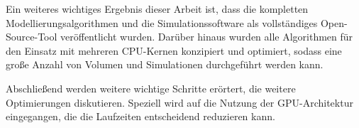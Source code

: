 Ein weiteres wichtiges Ergebnis dieser Arbeit ist, dass die kompletten Modellierungsalgorithmen und die Simulationssoftware als vollständiges Open-Source-Tool veröffentlicht wurden.
Darüber hinaus wurden alle Algorithmen für den Einsatz mit mehreren CPU-Kernen konzipiert und optimiert, sodass eine große Anzahl von Volumen und Simulationen durchgeführt werden kann.

Abschließend werden weitere wichtige Schritte erörtert, die weitere Optimierungen diskutieren.
Speziell wird auf die Nutzung der GPU-Architektur eingegangen, die die Laufzeiten entscheidend reduzieren kann.